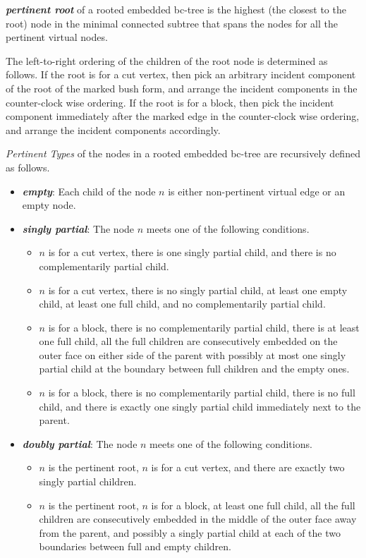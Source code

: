\documentclass[a4]{jgaa-art}
\newenvironment{definition}[1][Definition]{\begin{trivlist}
\item[\hskip \labelsep {\bfseries #1}]}{\end{trivlist}}
\begin{document}
\begin{definition}
{\bf \emph{pertinent root}} of a rooted embedded bc-tree is the highest (the closest to the root) node 
in the minimal connected subtree that spans the nodes for all the pertinent virtual nodes.
\end{definition}

The left-to-right ordering of the children of the root node is determined as follows.
If the root is for a cut vertex, then pick an arbitrary incident component of the root of the marked 
bush form,  and arrange the incident components in the counter-clock wise ordering.
If the root is for a block, then pick the incident component immediately after the marked edge in the 
counter-clock wise ordering, and arrange the incident components accordingly.


\begin{definition}
\emph{Pertinent Types} of the nodes in a rooted embedded bc-tree are recursively defined as follows.
\begin{itemize}
\item {\bf \emph{empty}}:
Each child of the node $n$ is either non-pertinent virtual edge or an empty node.
\item {\bf \emph{singly partial}}:
The node $n$ meets one of the following conditions.
\begin{itemize}
\item $n$ is for a cut vertex, there is one singly partial child, and there is no complementarily partial child.

\item $n$ is for a cut vertex, there is no singly partial child, at least one empty child, at least one full child, and no complementarily partial child.

\item $n$ is for a block, there is no complementarily partial child, there is at least one full child, all the full children are consecutively embedded on the outer face on either side of the parent with possibly at most one singly partial child at the boundary between full children and the empty ones.

\item $n$ is for a block, there is no complementarily partial child, there is no full child, and there is exactly one singly partial child immediately next to the parent.
\end{itemize}
\item {\bf \emph{doubly partial}}: 
The node $n$ meets one of the following conditions.
\begin{itemize}
\item $n$ is the pertinent root, $n$ is for a cut vertex, and there are exactly two singly partial children.
\item $n$ is the pertinent root, $n$ is for a block, at least one full child, all the full children are consecutively embedded in the middle of
 the outer face away from the parent, and possibly a singly partial child at each of the two boundaries 
between full and empty children.


\end{itemize}
\end{itemize}
\end{definition}
\end{document}
